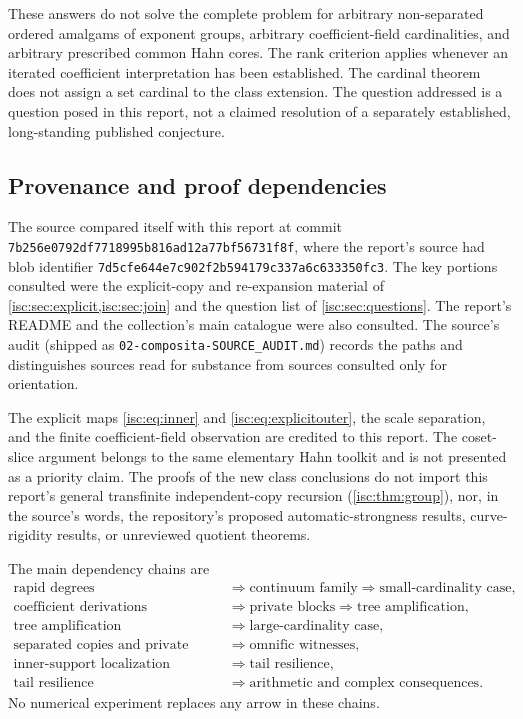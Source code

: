 \documentclass[11pt,letterpaper]{article}
\theoremstyle{definition}
\theoremstyle{remark}
\newcommand{\rpath}[1]{\nolinkurl{#1}}%
\numberwithin{equation}{section}
\begin{document}
These answers do not solve the complete problem for arbitrary non-separated
ordered amalgams of exponent groups, arbitrary coefficient-field
cardinalities, and arbitrary prescribed common Hahn cores. The rank
criterion applies whenever an iterated coefficient interpretation has been
established. The cardinal theorem does not assign a set cardinal to the
class extension. The question addressed is a question posed in this report,
not a claimed resolution of a separately established, long-standing
published conjecture.

\subsection{Provenance and proof dependencies}

The source compared itself with this report at commit
\nolinkurl{7b256e0792df7718995b816ad12a77bf56731f8f}, where the report's
source had blob identifier
\nolinkurl{7d5cfe644e7c902f2b594179c337a6c633350fc3}. The key portions
consulted were the explicit-copy and re-expansion material of
\cref{isc:sec:explicit,isc:sec:join} and the question list of
\cref{isc:sec:questions}. The report's README and the collection's main
catalogue were also consulted. The source's audit (shipped as
\rpath{02-composita-SOURCE\_AUDIT.md}) records the paths and distinguishes
sources read for substance from sources consulted only for orientation.

The explicit maps \eqref{isc:eq:inner} and \eqref{isc:eq:explicitouter}, the
scale separation, and the finite coefficient-field observation are credited
to this report. The coset-slice argument belongs to the same elementary Hahn
toolkit and is not presented as a priority claim. The proofs of the new
class conclusions do not import this report's general transfinite
independent-copy recursion (\cref{isc:thm:group}), nor, in the source's
words, the repository's proposed automatic-strongness results,
curve-rigidity results, or unreviewed quotient theorems.

The main dependency chains are
\begin{align*}
 \text{rapid degrees}
 &\Longrightarrow \text{continuum family}
 \Longrightarrow \text{small-cardinality case},\\
 \text{coefficient derivations}
 &\Longrightarrow \text{private blocks}
 \Longrightarrow \text{tree amplification},\\
 \text{tree amplification}
 &\Longrightarrow \text{large-cardinality case},\\
 \text{separated copies and private blocks}
 &\Longrightarrow \text{omnific witnesses},\\
 \text{inner-support localization}
 &\Longrightarrow \text{tail resilience},\\
 \text{tail resilience}
 &\Longrightarrow \text{arithmetic and complex consequences}.
\end{align*}
No numerical experiment replaces any arrow in these chains.
\end{document}
